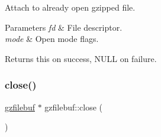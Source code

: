 Attach to already open gzipped file. 


\begin{DoxyParams}{Parameters}
{\em fd} & File descriptor. \\
\hline
{\em mode} & Open mode flags. \\
\hline
\end{DoxyParams}
\begin{DoxyReturn}{Returns}
{\ttfamily this} on success, N\+U\+LL on failure. 
\end{DoxyReturn}
\mbox{\label{classgzfilebuf_a18e628926f455f41d7715c2ddd9c0e64}} 
\subsubsection{\texorpdfstring{close()}{close()}\hspace{0.1cm}{\footnotesize\ttfamily [1/2]}}
{\footnotesize\ttfamily \mbox{\hyperlink{classgzfilebuf}{gzfilebuf}} $\ast$ gzfilebuf\+::close (\begin{DoxyParamCaption}{ }\end{DoxyParamCaption})}

